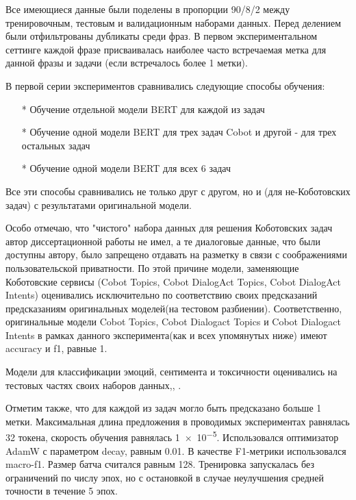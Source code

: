 Все имеющиеся данные были поделены в пропорции 90/8/2 между тренировочным, тестовым и валидационным наборами данных. Перед делением были отфильтрованы дубликаты среди фраз. В первом экспериментальном сеттинге каждой фразе присваивалась наиболее часто встречаемая метка для данной фразы и задачи (если встречалось более 1 метки).

В первой серии экспериментов сравнивались следующие способы обучения:
\begin{itemize}
\item[*] Обучение отдельной модели BERT для каждой из задач
\item[*] Обучение одной модели BERT для трех задач Cobot и другой - для трех остальных задач
\item[*] Обучение одной модели BERT для всех 6 задач
\end{itemize}

Все эти способы сравнивались не только друг с другом, но и (для не-Коботовских задач) с результатами оригинальной модели. 

Особо отмечаю, что "чистого" набора данных для решения Коботовских задач автор диссертационной работы не имел, а те диалоговые данные, что были доступны автору, было запрещено отдавать на разметку в связи с соображениями пользовательской приватности. По этой причине модели, заменяющие Коботовские сервисы (Cobot Topics, Cobot DialogAct Topics, Cobot DialogAct Intents) оценивались исключительно по соответствию своих предсказаний предсказаниям оригинальных моделей(на тестовом разбиении). Соответственно, оригинальные модели Cobot Topics, Cobot Dialogact Topics и Cobot Dialogact Intents в рамках данного эксперимента(как и всех упомянутых ниже) имеют accuracy и f1, равные 1. 

Модели для классификации эмоций, сентимента и токсичности оценивались на тестовых частях своих наборов данных\cite{sst},\cite{na_website_ndo_emo},\cite{toxic_kaggle} . 


Отметим также, что для каждой из задач могло быть предсказано больше 1 метки.
Максимальная длина предложения в проводимых экспериментах равнялась 32 токена, скорость обучения равнялась \num{1e-5}. Использовался оптимизатор AdamW с параметром decay, равным 0.01. В качестве F1-метрики использовался macro-f1. Размер батча считался равным 128. Тренировка запускалась без ограничений по числу эпох, но с остановкой в случае неулучшения средней точности в течение 5 эпох.



